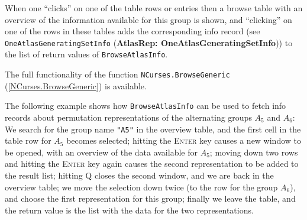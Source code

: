 \documentclass[a4paper,11pt]{report}
\begin{document}
{{{ When one ``clicks'' on one of the table rows or entries then a browse table with an overview of
the information available for this group is shown, and ``clicking'' on one of the rows in these tables adds the corresponding info record (see \texttt{OneAtlasGeneratingSetInfo} (\textbf{AtlasRep: OneAtlasGeneratingSetInfo})) to the list of return values of \texttt{BrowseAtlasInfo}. 

 The full functionality of the function \texttt{NCurses.BrowseGeneric} (\ref{NCurses.BrowseGeneric}) is available. 

 The following example shows how \texttt{BrowseAtlasInfo} can be used to fetch info records about permutation representations of the
alternating groups $A_5$ and $A_6$: We search for the group name \texttt{"A5"} in the overview table, and the first cell in the table row for $A_5$ becomes selected; hitting the \textsc{Enter} key causes a new window to be opened, with an overview of the data available
for $A_5$; moving down two rows and hitting the \textsc{Enter} key again causes the second representation to be added to the result list;
hitting \textsc{Q} closes the second window, and we are back in the overview table; we move the
selection down twice (to the row for the group $A_6$), and choose the first representation for this group; finally we leave the
table, and the return value is the list with the data for the two
representations. 

}}}
\end{document}
